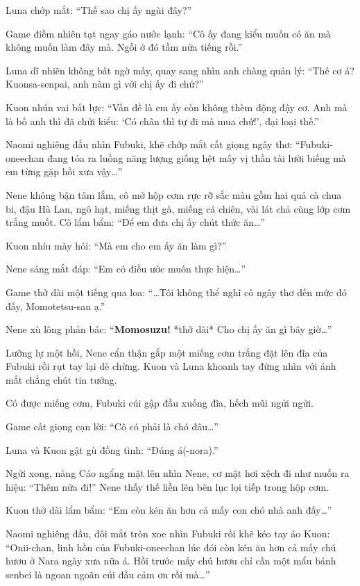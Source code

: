 \documentclass[../main.tex]{subfiles}
\begin{document}
Luna chớp mắt: ``Thế sao chị ấy ngùi đây?''

Game điềm nhiên tạt ngay gáo nước lạnh: ``Cô ấy đang kiểu muốn có ăn mà không muốn làm đây mà. Ngồi ở đó tầm nửa tiếng rồi.''

Luna dĩ nhiên không bất ngờ mấy, quay sang nhìn anh chàng quản lý: ``Thế cơ á? Kuonsa-senpai, anh nàm gì với chị ấy đi chứ?''

Kuon nhún vai bất lực: ``Vấn đề là em ấy còn không thèm động đậy cơ. Anh mà là bố anh thì đã chửi kiểu: `Có chân thì tự đi mà mua chứ!', đại loại thế.''

Naomi nghiêng đầu nhìn Fubuki, khẽ chớp mắt cất giọng ngây thơ: ``Fubuki-oneechan đang tỏa ra luồng năng lượng giống hệt mấy vị thần tài lười biếng mà em từng gặp hồi xưa vậy\dots''

Nene không bận tâm lắm, cô mở hộp cơm rực rỡ sắc màu gồm hai quả cà chua bi, đậu Hà Lan, ngô hạt, miếng thịt gà, miếng cá chiên, vài lát chả cùng lớp cơm trắng muốt. Cô lẩm bẩm: ``Để em đưa chị ấy chút thức ăn\dots''

Kuon nhíu mày hỏi: ``Mà em cho em ấy ăn làm gì?''

Nene sáng mắt đáp: ``Em có điều ước muốn thực hiện\dots''

Game thở dài một tiếng qua loa: ``\dots Tôi không thể nghĩ cô ngây thơ đến mức đó đấy, Momotetsu-san ạ.''

Nene xù lông phản bác: ``\textbf{Momosuzu!} *thở dài* Cho chị ấy ăn gì bây giờ\dots''

Lưỡng lự một hồi, Nene cẩn thận gắp một miếng cơm trắng đặt lên đĩa của Fubuki rồi rụt tay lại dè chừng. Kuon và Luna khoanh tay đứng nhìn với ánh mắt chẳng chút tin tưởng.

Có được miếng cơm, Fubuki cúi gập đầu xuống đĩa, hếch mũi ngửi ngửi.


Game cất giọng cạn lời: ``Cô có phải là chó đâu\dots''

Luna và Kuon gật gù đồng tình: ``Đúng á(-nora).''

Ngửi xong, nàng Cáo ngẩng mặt lên nhìn Nene, cơ mặt hơi xệch đi như muốn ra hiệu: ``Thêm nữa đi!'' Nene thấy thế liền lẽn bẽn lục lọi tiếp trong hộp cơm.

Kuon thở dài lẩm bẩm: ``Em còn kén ăn hơn cả mấy con chó nhà anh đấy\dots''

Naomi nghiêng đầu, đôi mắt tròn xoe nhìn Fubuki rồi khẽ kéo tay áo Kuon: ``Onii-chan, linh hồn của Fubuki-oneechan lúc đói còn kén ăn hơn cả mấy chú hươu ở Nara ngày xưa nữa á. Hồi trước mấy chú hươu chỉ cần một mẩu bánh senbei là ngoan ngoãn cúi đầu cảm ơn rồi mà\dots''
\end{document}
